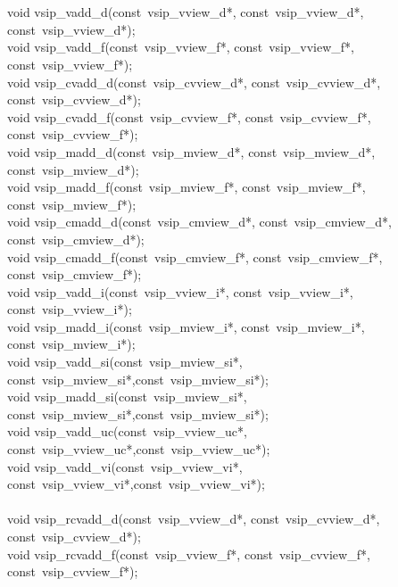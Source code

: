 \\\cvsiplh
\begin{cfuncs}
\\\hline
void vsip\_vadd\_d(const~vsip\_vview\_d*, const~vsip\_vview\_d*, const~vsip\_vview\_d*);\Bs\\
void vsip\_vadd\_f(const~vsip\_vview\_f*, const~vsip\_vview\_f*, const~vsip\_vview\_f*);\Bs\\
void vsip\_cvadd\_d(const~vsip\_cvview\_d*, const~vsip\_cvview\_d*, const~vsip\_cvview\_d*);\Bs\\
void vsip\_cvadd\_f(const~vsip\_cvview\_f*,  const~vsip\_cvview\_f*, const~vsip\_cvview\_f*);\Bs\\
void vsip\_madd\_d(const~vsip\_mview\_d*, const~vsip\_mview\_d*, const~vsip\_mview\_d*);\Bs\\
void vsip\_madd\_f(const~vsip\_mview\_f*, const~vsip\_mview\_f*, const~vsip\_mview\_f*);\Bs\\
void vsip\_cmadd\_d(const~vsip\_cmview\_d*, const~vsip\_cmview\_d*, const~vsip\_cmview\_d*);\Bs\\
void vsip\_cmadd\_f(const~vsip\_cmview\_f*, const~vsip\_cmview\_f*, const~vsip\_cmview\_f*);\Bs\\
void vsip\_vadd\_i(const~vsip\_vview\_i*, const~vsip\_vview\_i*, const~vsip\_vview\_i*);\Bs\\
void vsip\_madd\_i(const~vsip\_mview\_i*, const~vsip\_mview\_i*, const~vsip\_mview\_i*);\Bs\\
void vsip\_vadd\_si(const~vsip\_mview\_si*, const~vsip\_mview\_si*,const~vsip\_mview\_si*);\Bs\\
void vsip\_madd\_si(const~vsip\_mview\_si*, const~vsip\_mview\_si*,const~vsip\_mview\_si*);\Bs\\
void vsip\_vadd\_uc(const~vsip\_vview\_uc*, const~vsip\_vview\_uc*,const~vsip\_vview\_uc*);\Bs\\
void vsip\_vadd\_vi(const~vsip\_vview\_vi*, const~vsip\_vview\_vi*,const~vsip\_vview\_vi*);\Bs\\
\\\hline
void vsip\_rcvadd\_d(const~vsip\_vview\_d*, const~vsip\_cvview\_d*, const~vsip\_cvview\_d*);\Bs\\
void vsip\_rcvadd\_f(const~vsip\_vview\_f*, const~vsip\_cvview\_f*, const~vsip\_cvview\_f*);\Bs\\

\end{cfuncs}
